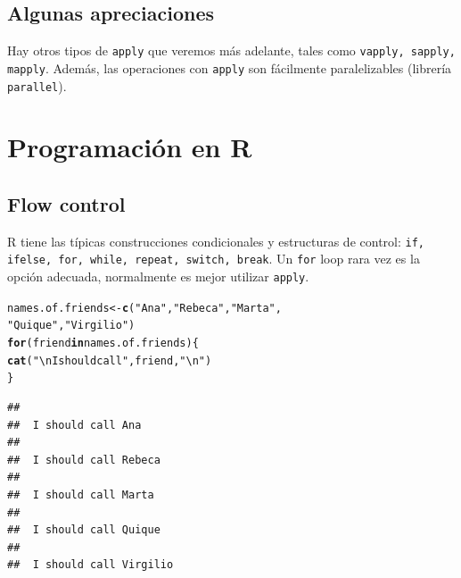 \documentclass{config/apuntes}\usepackage[]{graphicx}\usepackage[]{xcolor}
\makeatletter
\newcommand{\hlsng}[1]{\textcolor[rgb]{0.192,0.494,0.8}{#1}}%
\newcommand{\hldef}[1]{\textcolor[rgb]{0.345,0.345,0.345}{#1}}%
\newcommand{\hlkwa}[1]{\textcolor[rgb]{0.161,0.373,0.58}{\textbf{#1}}}%
\newcommand{\hlkwb}[1]{\textcolor[rgb]{0.69,0.353,0.396}{#1}}%
\newcommand{\hlkwd}[1]{\textcolor[rgb]{0.737,0.353,0.396}{\textbf{#1}}}%
\newenvironment{kframe}{%
 \def\at@end@of@kframe{}%
 \ifinner\ifhmode%
  \def\at@end@of@kframe{\end{minipage}}%
  \begin{minipage}{\columnwidth}%
 \fi\fi%
 \def\FrameCommand##1{\hskip\@totalleftmargin \hskip-\fboxsep
 \colorbox{shadecolor}{##1}\hskip-\fboxsep
     \hskip-\linewidth \hskip-\@totalleftmargin \hskip\columnwidth}%
 \MakeFramed {\advance\hsize-\width
   \@totalleftmargin\z@ \linewidth\hsize
   \@setminipage}}%
 {\par\unskip\endMakeFramed%
 \at@end@of@kframe}
\newenvironment{knitrout}{}{} %
\newcommand{\code}[1]{\texttt{#1}}
\makeatother
\begin{document}
\subsection{Algunas apreciaciones}
Hay otros tipos de \code{apply} que veremos más adelante, tales como \code{vapply, sapply, mapply}. Además, las operaciones con \code{apply} son fácilmente paralelizables (librería \code{parallel}).

\section{Programación en R}
\subsection{Flow control}
R tiene las típicas construcciones condicionales y estructuras de control: \code{if, ifelse, for, while, repeat, switch, break}. Un \code{for} loop rara vez es la opción adecuada, normalmente es mejor utilizar \code{apply}.

\begin{knitrout}
\color{fgcolor}\begin{kframe}
\begin{alltt}
\hldef{names.of.friends} \hlkwb{<-} \hlkwd{c}\hldef{(}\hlsng{"Ana"}\hldef{,} \hlsng{"Rebeca"}\hldef{,} \hlsng{"Marta"}\hldef{,}
                      \hlsng{"Quique"}\hldef{,} \hlsng{"Virgilio"}\hldef{)}
\hlkwa{for}\hldef{(friend} \hlkwa{in} \hldef{names.of.friends) \{}
  \hlkwd{cat}\hldef{(}\hlsng{"\textbackslash{}n I should call"}\hldef{, friend,} \hlsng{"\textbackslash{}n"}\hldef{)}
\hldef{\}}
\end{alltt}
\begin{verbatim}
## 
##  I should call Ana 
## 
##  I should call Rebeca 
## 
##  I should call Marta 
## 
##  I should call Quique 
## 
##  I should call Virgilio
\end{verbatim}
\end{kframe}
\end{knitrout}
\end{document}
